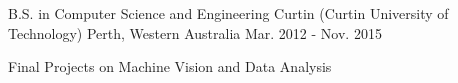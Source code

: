 

\begin{cventries}

  \cventry
    {B.S. in Computer Science and Engineering} %
    {Curtin (Curtin University of Technology)} %
    {Perth, Western Australia} %
    {Mar. 2012 - Nov. 2015} %
    {
      \begin{cvitems} %
        \item {Final Projects on Machine Vision and Data Analysis}
      \end{cvitems}
    }

\end{cventries}

